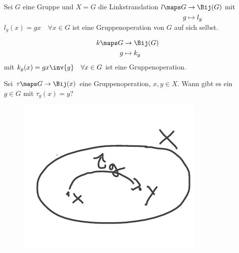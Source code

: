 \begin{beispiel}\label{operation:beispiele}
    \begin{eigenschaftenenumerate}
        \item \label{operation:beispiele:linkstranslation} Sei \( G \) eine Gruppe und \( X=G \) die Linkstranslation \( l\maps \begin{aligned}[t] 
            G&\to \Bij(G)\\
            g&\mapsto l_g
        \end{aligned} \) mit \( l_g(x)=gx \quad\forall x\in G \) ist eine Gruppenoperation von \( G \) auf sich selbst.
        
        \item \label{operation:beispiele:konjugation}\begin{align*}
            k\maps \begin{aligned}[t] 
                G &\to \Bij(G)\\
                g &\mapsto k_g
            \end{aligned}
        \end{align*}
        mit \( k_g(x)=gx\inv{g} \quad\forall x\in G \) ist eine Gruppenoperation.
    \end{eigenschaftenenumerate}
\end{beispiel}
\begin{frage*}
    Sei \( \tau\maps G\to \Bij(x) \) eine Gruppenoperation, \( x,y\in X \). 
    Wann gibt es ein \( g\in G \) mit \( \tau_g(x)=y \)?
    \begin{figure}[H]
        \centering
        \includegraphics[width=0.5\linewidth]{figures/einfach_transitiv}
        \label{fig:einfach_transitiv}
    \end{figure}
    
\end{frage*}

